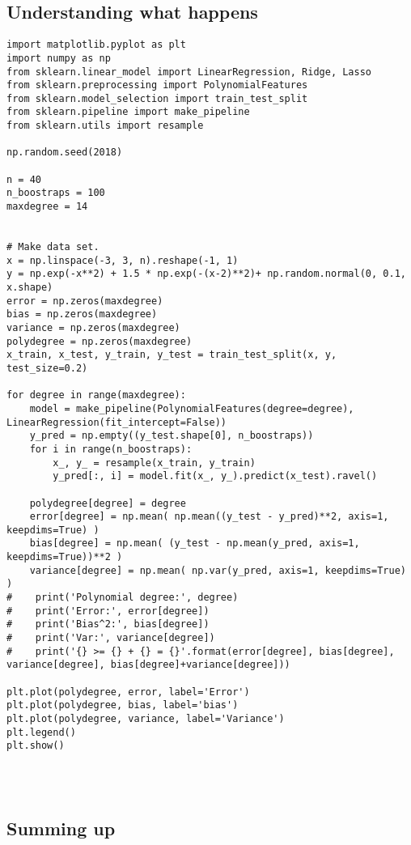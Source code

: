 \documentclass[%
oneside,                 %
final,                   %
10pt]{article}
\begin{document}
\subsection*{Understanding what happens}
\begin{verbatim}
import matplotlib.pyplot as plt
import numpy as np
from sklearn.linear_model import LinearRegression, Ridge, Lasso
from sklearn.preprocessing import PolynomialFeatures
from sklearn.model_selection import train_test_split
from sklearn.pipeline import make_pipeline
from sklearn.utils import resample

np.random.seed(2018)

n = 40
n_boostraps = 100
maxdegree = 14


# Make data set.
x = np.linspace(-3, 3, n).reshape(-1, 1)
y = np.exp(-x**2) + 1.5 * np.exp(-(x-2)**2)+ np.random.normal(0, 0.1, x.shape)
error = np.zeros(maxdegree)
bias = np.zeros(maxdegree)
variance = np.zeros(maxdegree)
polydegree = np.zeros(maxdegree)
x_train, x_test, y_train, y_test = train_test_split(x, y, test_size=0.2)

for degree in range(maxdegree):
    model = make_pipeline(PolynomialFeatures(degree=degree), LinearRegression(fit_intercept=False))
    y_pred = np.empty((y_test.shape[0], n_boostraps))
    for i in range(n_boostraps):
        x_, y_ = resample(x_train, y_train)
        y_pred[:, i] = model.fit(x_, y_).predict(x_test).ravel()

    polydegree[degree] = degree
    error[degree] = np.mean( np.mean((y_test - y_pred)**2, axis=1, keepdims=True) )
    bias[degree] = np.mean( (y_test - np.mean(y_pred, axis=1, keepdims=True))**2 )
    variance[degree] = np.mean( np.var(y_pred, axis=1, keepdims=True) )
#    print('Polynomial degree:', degree)
#    print('Error:', error[degree])
#    print('Bias^2:', bias[degree])
#    print('Var:', variance[degree])
#    print('{} >= {} + {} = {}'.format(error[degree], bias[degree], variance[degree], bias[degree]+variance[degree]))

plt.plot(polydegree, error, label='Error')
plt.plot(polydegree, bias, label='bias')
plt.plot(polydegree, variance, label='Variance')
plt.legend()
plt.show()




\end{verbatim}

\subsection*{Summing up}
\end{document}
